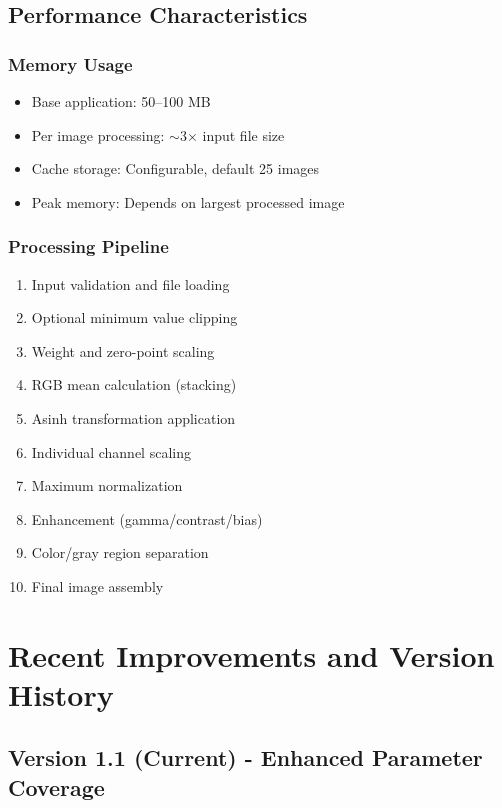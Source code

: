 \documentclass[11pt,a4paper]{article}
\begin{document}
\subsection{Performance Characteristics}

\subsubsection{Memory Usage}

\begin{itemize}[leftmargin=*]
\item Base application: 50--100 MB
\item Per image processing: $\sim$3× input file size
\item Cache storage: Configurable, default 25 images
\item Peak memory: Depends on largest processed image
\end{itemize}

\subsubsection{Processing Pipeline}

\begin{enumerate}
\item Input validation and file loading
\item Optional minimum value clipping
\item Weight and zero-point scaling
\item RGB mean calculation (stacking)
\item Asinh transformation application
\item Individual channel scaling
\item Maximum normalization
\item Enhancement (gamma/contrast/bias)
\item Color/gray region separation
\item Final image assembly
\end{enumerate}

\section{Recent Improvements and Version History}

\subsection{Version 1.1 (Current) - Enhanced Parameter Coverage}
\end{document}
